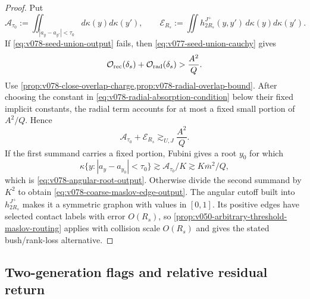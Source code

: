\documentclass[10pt]{article}
\begin{document}
\begin{proof}
Put
\[
\mathcal A_{\tau_0}
:=
\iint_{|a_y-a_{y'}|<\tau_0}d\kappa(y)d\kappa(y'),
\qquad
\mathcal E_{R_s}
:=
\iint h_{2R_s}^{J^+}(y,y')\,d\kappa(y)d\kappa(y').
\]
If \eqref{eq:v078-seed-union-output} fails, then
\eqref{eq:v077-seed-union-cauchy} gives
\[
\mathcal O_{\rm rec}(\delta_s)+\mathcal O_{\rm rad}(\delta_s)
>
\frac{A^2}{Q}.
\]
Use \cref{prop:v078-close-overlap-charge,prop:v078-radial-overlap-bound}.  After choosing the
constant in \eqref{eq:v078-radial-absorption-condition} below their fixed implicit constants, the
radial term accounts for at most a fixed small portion of \(A^2/Q\).  Hence
\begin{equation}
\label{eq:v078-angular-or-coarse-edge}
\mathcal A_{\tau_0}+\mathcal E_{R_s}
\gtrsim_{U,J}
\frac{A^2}{Q}.
\end{equation}
If the first summand carries a fixed portion, Fubini gives a root \(y_0\) for which
\[
\kappa\{y:|a_y-a_{y_0}|<\tau_0\}
\gtrsim
\mathcal A_{\tau_0}/K
\gtrsim
K\overline m^2/Q,
\]
which is \eqref{eq:v078-angular-root-output}.  Otherwise divide the second summand by \(K^2\) to
obtain \eqref{eq:v078-coarse-maslov-edge-output}.  The angular cutoff built into
\(h_{2R_s}^{J^+}\) makes it a symmetric graphon with values in \([0,1]\).  Its positive edges have
selected contact labels with error \(O(R_s)\), so
\cref{prop:v050-arbitrary-threshold-maslov-routing} applies with collision scale \(O(R_s)\) and
gives the stated bush/rank-loss alternative.
\end{proof}

\subsection{Two-generation flags and relative residual return}
\end{document}
